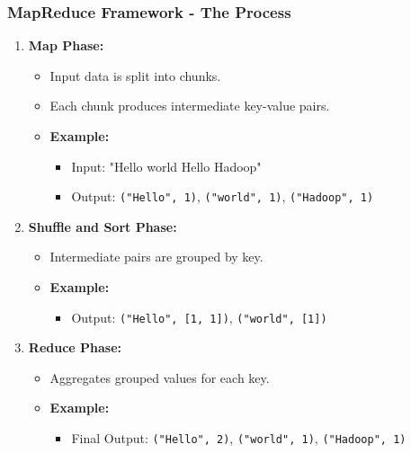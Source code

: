 \documentclass[aspectratio=169]{beamer}
\begin{document}
\begin{frame}
    \frametitle{MapReduce Framework - The Process}
    \begin{enumerate}
        \item \textbf{Map Phase:}
            \begin{itemize}
                \item Input data is split into chunks.
                \item Each chunk produces intermediate key-value pairs.
                \item \textbf{Example:} 
                    \begin{itemize}
                        \item Input: "Hello world Hello Hadoop" 
                        \item Output: \texttt{("Hello", 1)}, \texttt{("world", 1)}, \texttt{("Hadoop", 1)}
                    \end{itemize}
            \end{itemize}
        
        \item \textbf{Shuffle and Sort Phase:}
            \begin{itemize}
                \item Intermediate pairs are grouped by key.
                \item \textbf{Example:} 
                    \begin{itemize}
                        \item Output: \texttt{("Hello", [1, 1])}, \texttt{("world", [1])}
                    \end{itemize}
            \end{itemize}
        
        \item \textbf{Reduce Phase:}
            \begin{itemize}
                \item Aggregates grouped values for each key.
                \item \textbf{Example:} 
                    \begin{itemize}
                        \item Final Output: \texttt{("Hello", 2)}, \texttt{("world", 1)}, \texttt{("Hadoop", 1)}
                    \end{itemize}
            \end{itemize}
    \end{enumerate}
\end{frame}
\end{document}
